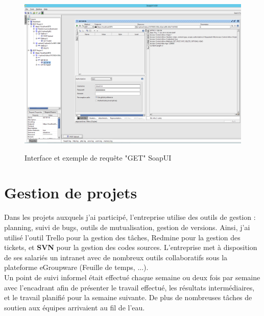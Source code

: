 \begin{center}
\begin{figure}[h] \centering
\includegraphics[width=16cm]{images/soapUI_getById_sansResponse_small.png}\\
\caption{\label{SoapUIGet} Interface et exemple de requête "GET" SoapUI}
\end{figure}
\end{center}


\section{Gestion de projets}

Dans les projets auxquels j'ai participé, l'entreprise utilise des outils de gestion : planning, suivi de bugs, outils de mutualisation, gestion de versions. Ainsi, j'ai utilisé l'outil Trello pour la gestion des tâches, Redmine pour la gestion des tickets, et \textbf{SVN} pour la gestion des codes sources. L'entreprise met à disposition de ses salariés un intranet avec de nombreux outils collaboratifs sous la plateforme eGroupware (Feuille de temps, ...).\\

Un point de suivi informel était effectué chaque semaine ou deux fois par semaine avec l'encadrant afin de présenter le travail effectué, les résultats intermédiaires, et le travail planifié pour la semaine suivante. De plus de nombreuses tâches de soutien aux équipes arrivaient au fil de l'eau.\\

